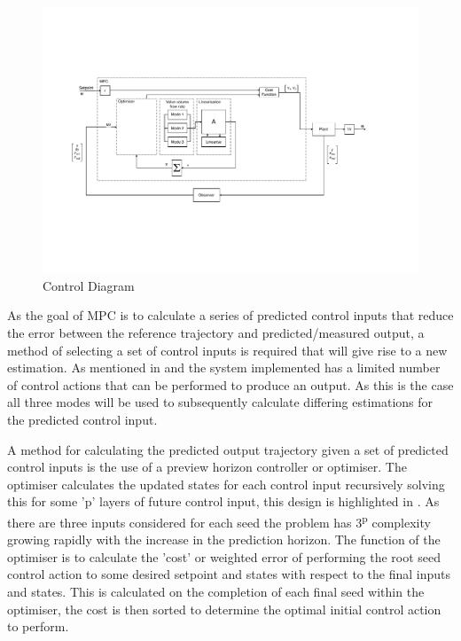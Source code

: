 \documentclass[11pt,a4paper]{article}
\begin{document}
\begin{figure}[hbt!]
    \centering
    \includegraphics[clip, trim=2cm 4cm 4cm 4cm, width=1.00\textwidth]{BlockDiagram_Overview.pdf}
    \caption{Control Diagram}
    \label{fig:control_diagram_overview}
\end{figure}

As the goal of MPC is to calculate a series of predicted control inputs that reduce the error between the reference trajectory and predicted/measured output, a method of selecting a set of control inputs is required that will give rise to a new estimation. As mentioned in  and  the system implemented has a limited number of control actions that can be performed to produce an output. As this is the case all three modes will be used to subsequently calculate differing estimations for the predicted control input. \newline

A method for calculating the predicted output trajectory given a set of predicted control inputs is the use of a preview horizon controller or optimiser. The optimiser calculates the updated states for each control input recursively solving this for some 'p' layers of future control input, this design is highlighted in . As there are three inputs considered for each seed the problem has 3\textsuperscript{p} complexity growing rapidly with the increase in the prediction horizon. The function of the optimiser is to calculate the 'cost'  or weighted error of performing the root seed control action to some desired setpoint and states with respect to the final inputs and states. This is calculated on the completion of each final seed within the optimiser, the cost is then sorted to determine the optimal initial control action to perform.
\end{document}
